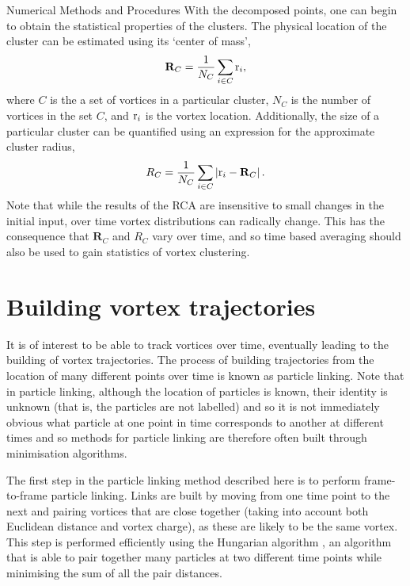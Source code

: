 \begin{chapter}{\label{cha:numerics}Numerical Methods and Procedures}
With the decomposed points, one can begin to obtain the statistical properties of the clusters. The physical location of the cluster can be estimated using its `center of mass',
\begin{equation}\label{eq:rcacom}
  \mathbf{R}_C = \frac{1}{N_C}\sum\limits_{i\in C}{\rm r}_i,
\end{equation}
where $C$ is the a set of vortices in a particular cluster, $N_C$ is the number of vortices in the set $C$, and ${\rm r}_i$ is the vortex location. Additionally, the size of a particular cluster can be quantified using an expression for the approximate cluster radius,
\begin{equation}\label{eq:rcacom}
  R_C = \frac{1}{N_C}\sum\limits_{i\in C} \left |{\rm r}_i - {\bf R}_C \right |.
\end{equation}
Note that while the results of the RCA are insensitive to small changes in the initial input, over time vortex distributions can radically change. This has the consequence that $\mathbf{R}_C$ and $R_C$ vary over time, and so time based averaging should also be used to gain statistics of vortex clustering.

\section{\label{section:vortextracking} Building vortex trajectories}
It is of interest to be able to track vortices over time, eventually leading to the building of vortex trajectories. The process of building trajectories from the location of many different points over time is known as particle linking. Note that in particle linking, although the location of particles is known, their identity is unknown (that is, the particles are not labelled) and so it is not immediately obvious what particle at one point in time corresponds to another at different times and so methods for particle linking are therefore often built through minimisation algorithms. 

The first step in the particle linking method described here is to perform frame-to-frame particle linking. Links are built by moving from one time point to the next and pairing vortices that are close together (taking into account both Euclidean distance and vortex charge), as these are likely to be the same vortex. This step is performed efficiently using the Hungarian algorithm \cite{hung}, an algorithm that is able to pair together many particles at two different time points while minimising the sum of all the pair distances.


\end{chapter}
